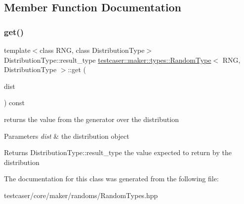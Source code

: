 \subsection{Member Function Documentation}
\mbox{\label{classtestcaser_1_1maker_1_1types_1_1RandomType_a48c855182f25804a9b8c55ec5bf9aba5}} 
\subsubsection{\texorpdfstring{get()}{get()}}
{\footnotesize\ttfamily template$<$class R\+NG, class Distribution\+Type$>$ \\
Distribution\+Type\+::result\+\_\+type \hyperlink{classtestcaser_1_1maker_1_1types_1_1RandomType}{testcaser\+::maker\+::types\+::\+Random\+Type}$<$ R\+NG, Distribution\+Type $>$\+::get (\begin{DoxyParamCaption}\item[{Distribution\+Type \&}]{dist }\end{DoxyParamCaption}) const\hspace{0.3cm}{\ttfamily [inline]}}



returns the value from the generator over the distribution 


\begin{DoxyParams}{Parameters}
{\em dist} & the distribution object \\
\hline
\end{DoxyParams}
\begin{DoxyReturn}{Returns}
Distribution\+Type\+::result\+\_\+type the value expected to return by the distribution 
\end{DoxyReturn}


The documentation for this class was generated from the following file\+:\begin{DoxyCompactItemize}
\item 
testcaser/core/maker/randoms/Random\+Types.\+hpp\end{DoxyCompactItemize}
